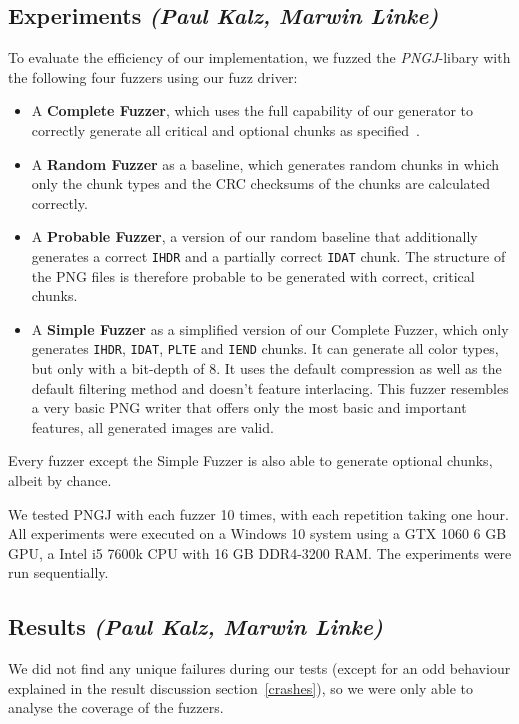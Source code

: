 \documentclass[runningheads]{llncs}
\begin{document}
\subsection{Experiments \normalfont\textit{(Paul Kalz, Marwin Linke)}}
To evaluate the efficiency of our implementation, we fuzzed the \textit{PNGJ}-libary with the following four fuzzers using our fuzz driver:
\begin{itemize}
    \item A \textbf{Complete Fuzzer}, which uses the full capability of our generator to correctly generate all critical and optional chunks as specified~\cite{libpng_chunks}.
    \item A \textbf{Random Fuzzer} as a baseline, which generates random chunks in which only the chunk types and the CRC checksums of the chunks are calculated correctly.
    \item A \textbf{Probable Fuzzer}, a version of our random baseline that additionally generates a correct \texttt{IHDR} and a partially correct \texttt{IDAT} chunk. The structure of the PNG files is therefore probable to be generated with correct, critical chunks.
    \item A \textbf{Simple Fuzzer} as a simplified version of our Complete Fuzzer, which only generates \texttt{IHDR}, \texttt{IDAT}, \texttt{PLTE} and \texttt{IEND} chunks. It can generate all color types, but only with a bit-depth of 8. 
    It uses the default compression as well as the default filtering method and doesn't feature interlacing. This fuzzer resembles a very basic PNG writer that offers only the most basic and important features, all generated images are valid.

\end{itemize}
Every fuzzer except the Simple Fuzzer is also able to generate optional chunks, albeit by chance.

We tested PNGJ with each fuzzer 10 times, with each repetition taking one hour. All experiments were executed on a Windows 10 system using a GTX 1060 6 GB GPU, a Intel i5 7600k CPU with 16 GB DDR4-3200 RAM. The experiments were run sequentially.

\subsection{Results \normalfont\textit{(Paul Kalz, Marwin Linke)}}
We did not find any unique failures during our tests (except for an odd behaviour explained in the result discussion section~\ref{crashes}), so we were only able to analyse the coverage of the fuzzers.
\end{document}
